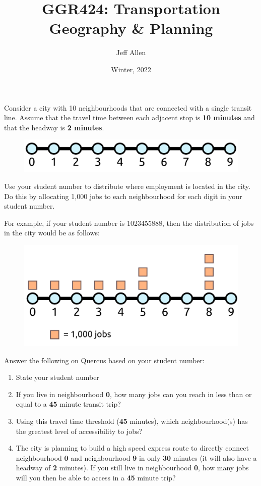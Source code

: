 \documentclass[11pt]{article}
\title{\textbf{GGR424: Transportation Geography \& Planning}}
\author{Jeff Allen}
\date{Winter, 2022}
\begin{document}
	\allsectionsfont{\sffamily}
		
%		
	
	Consider a city with 10 neighbourhoods that are connected with a single transit line. Assume that the travel time between each adjacent stop is \textbf{10 minutes} and that the headway is \textbf{2 minutes}.
	
	\begin{figure}[h]
		\centering
		\includegraphics[width=0.5\linewidth]{images/city_plain.png}
	\end{figure}

	Use your student number to distribute where employment is located in the city. Do this by allocating 1,000 jobs to each neighbourhood for each digit in your student number.
	
	For example, if your student number is 1023455888, then the distribution of jobs in the city would be as follows:
	
	\begin{figure}[h]
		\centering
		\includegraphics[width=0.5\linewidth]{images/city_jobs.png}
	\end{figure}
	
	Answer the following on Quercus based on your student number:
	
	\begin{enumerate}
		
		\item State your student number
		
		\item If you live in neighbourhood \textbf{0}, how many jobs can you reach in less than or equal to a \textbf{45} minute transit trip?
		
		\item Using this travel time threshold (\textbf{45} minutes), which neighbourhood(s) has the greatest level of accessibility to jobs?
		
		\item The city is planning to build a high speed express route to directly connect neighbourhood \textbf{0} and neighbourhood \textbf{9} in only \textbf{30} minutes (it will also have a headway of \textbf{2} minutes). If you still live in neighbourhood \textbf{0}, how many jobs will you then be able to access in a \textbf{45} minute trip?
		
	\end{enumerate}
	
	
	
	
\end{document}
